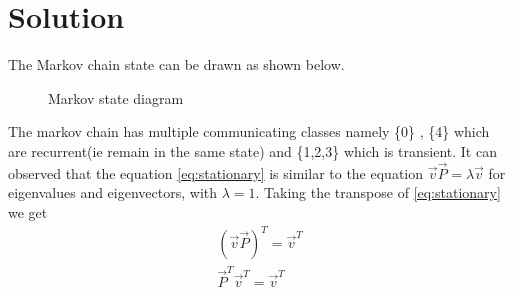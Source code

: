 \documentclass[journal,12pt,twocolumn]{IEEEtran}
\begin{document}
\section{Solution}
The Markov chain state can be drawn as shown below.
\begin{figure}[!ht]
	\centering
	\resizebox{\columnwidth}{!}{}
	\caption{{Markov state diagram}}
	\label{fig1:State Diagram}
\end{figure}
The markov chain has multiple communicating classes namely \{0\} , \{4\} which are recurrent(ie remain in the same state) and \{1,2,3\} which is transient.\linebreak
It can observed that the equation \eqref{eq:stationary} is similar to the equation $\vec{v}\vec{P}= \lambda\vec{v}$ for eigenvalues and eigenvectors, with $\lambda = 1$.\linebreak
Taking the transpose of \eqref{eq:stationary} we get
\begin{align}
	{(\vec{v}\vec{P})}^T= \vec{v}^T\\
	\vec{P}^T\vec{v}^T=\vec{v}^T
\end{align}
\end{document}
